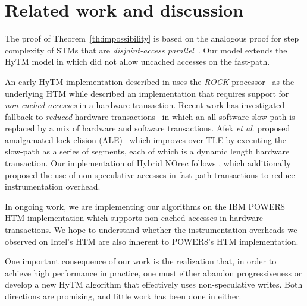 \section{Related work and discussion}
\label{sec:rel}
%
The proof of Theorem~\ref{th:impossibility} is based on the analogous proof for step complexity of STMs that are \emph{disjoint-access parallel}~\cite{prog15-pact}.
Our model extends the HyTM model in \cite{hytm14disc} which did not allow uncached accesses on the fast-path.

An early HyTM implementation described in \cite{damronhytm} uses the \emph{ROCK} processor~\cite{rock} as the underlying HTM
while \cite{kumarhytm} described an implementation that requires support for \emph{non-cached accesses} in a hardware transaction. 
Recent work has investigated fallback to \emph{reduced} hardware transactions~\cite{MS13}
in which an all-software slow-path is replaced by a mix of hardware and software transactions. 
Afek \emph{et al}. proposed amalgamated lock elision (ALE)~\cite{ale15} which improves over TLE
by executing the slow-path as a series of segments, each of which is a dynamic length hardware transaction.
Our implementation of Hybrid NOrec follows \cite{hynorecriegel}, which additionally proposed the use of non-speculative accesses
in fast-path transactions to reduce instrumentation overhead. %

In ongoing work, we are implementing our algorithms on the IBM POWER8 HTM implementation which supports
non-cached accesses in hardware transactions.
We hope to understand whether the instrumentation overheads we observed
on Intel's HTM are also inherent to POWER8's HTM implementation.

One important consequence of our work is the realization that, in order to achieve high performance in practice, one must either abandon progressiveness or develop a new HyTM algorithm that effectively uses non-speculative writes.
Both directions are promising, and little work has been done in either.